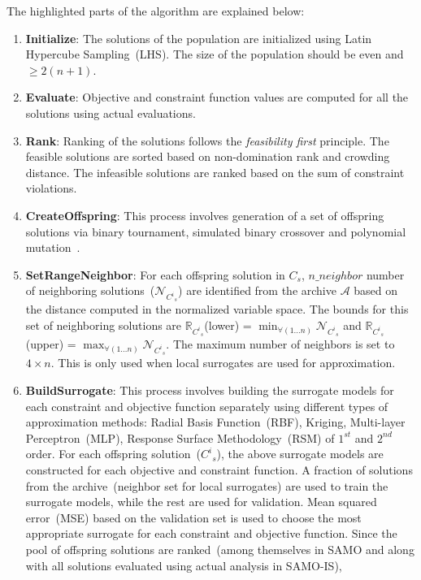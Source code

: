 The highlighted parts of the algorithm are explained below:\\ 
\begin{enumerate} 
	\item
	\textbf{Initialize}: The solutions of the population are initialized using Latin Hypercube
	Sampling~(LHS). The size of the population should be even and $\geq 2(n+1)$.
	\item \textbf{Evaluate}: Objective and constraint function values are computed for
	all the solutions using actual evaluations. \item \textbf{Rank}: Ranking of the solutions follows
	the \textit{feasibility first} principle. The feasible solutions are sorted based on non-domination
	rank and crowding distance. The infeasible solutions are ranked based on the sum of constraint
	violations. 
	\item \textbf{CreateOffspring}: This process involves generation of a set of offspring
	solutions via binary tournament, simulated binary crossover and polynomial
	mutation~\cite{deb2002fae}. \item \textbf{SetRangeNeighbor}: For each offspring solution in $C_s$,
	$n\_neighbor$ number of neighboring solutions~($\mathcal{N}_{{C^{i}}_s}$) are identified from the
	archive $\mathcal{A}$ based on the distance computed in the normalized variable space. The bounds
	for this set of neighboring solutions are $\mathbb{R}_{{C^{i}}_s}$(lower) = $\min_{\forall (1\dots
		n)} \mathcal{N}_{{C^{i}}_s}$ and $\mathbb{R}_{{C^{i}}_s}$(upper) = $\max_{\forall (1\dots n)}
	\mathcal{N}_{{C^{i}}_s}$. The maximum number of neighbors is set to $4 \times n$. This is only used
	when local surrogates are used for approximation. 
	\item \textbf{BuildSurrogate}: This process
	involves building the surrogate models for each constraint and objective function separately using
	different types of approximation methods: Radial Basis Function~(RBF), Kriging, Multi-layer
	Perceptron~(MLP), Response Surface Methodology~(RSM) of $1^{st}$ and $2^{nd}$ order. For each
	offspring solution~(${C^{i}}_s$), the above surrogate models are constructed for each objective and
	constraint function. A fraction of solutions from the archive~(neighbor set for local surrogates)
	are used to train the surrogate models, while the rest are used for validation. Mean squared
	error~(MSE) based on the validation set is used to choose the most appropriate surrogate for each
	constraint and objective function. Since the pool of offspring solutions  are ranked~(among themselves in SAMO and along with all solutions evaluated using actual analysis in SAMO-IS), 

\end{enumerate}
